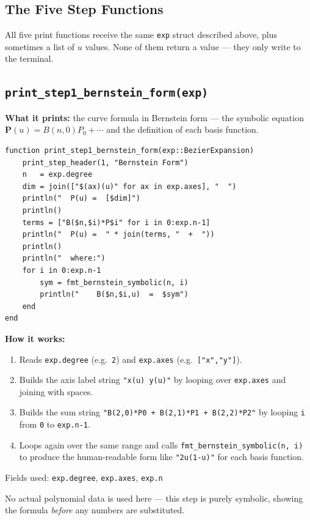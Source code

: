 \documentclass[12pt, a4paper]{article}
\newcommand{\cd}[1]{\texttt{#1}}
\begin{document}
\subsection*{The Five Step Functions}

All five print functions receive the same \cd{exp} struct
described above, plus sometimes a list of $u$ values.
None of them return a value --- they only write to the terminal.

\subsection{\texttt{print\_step1\_bernstein\_form(exp)}}

\textbf{What it prints:} the curve formula in Bernstein form ---
the symbolic equation $\mathbf{P}(u) = B(n,0)P_0 + \cdots$
and the definition of each basis function.

\begin{verbatim}
function print_step1_bernstein_form(exp::BezierExpansion)
    print_step_header(1, "Bernstein Form")
    n   = exp.degree
    dim = join(["$(ax)(u)" for ax in exp.axes], "  ")
    println("  P(u) =  [$dim]")
    println()
    terms = ["B($n,$i)*P$i" for i in 0:exp.n-1]
    println("  P(u) =  " * join(terms, "  +  "))
    println()
    println("  where:")
    for i in 0:exp.n-1
        sym = fmt_bernstein_symbolic(n, i)
        println("    B($n,$i,u)  =  $sym")
    end
end
\end{verbatim}

\textbf{How it works:}

\begin{enumerate}
  \item Reads \cd{exp.degree} (e.g.\ \cd{2}) and \cd{exp.axes}
        (e.g.\ \cd{["x","y"]}).
  \item Builds the axis label string \cd{"x(u)  y(u)"}
        by looping over \cd{exp.axes} and joining with spaces.
  \item Builds the sum string \cd{"B(2,0)*P0  +  B(2,1)*P1  +  B(2,2)*P2"}
        by looping \cd{i} from \cd{0} to \cd{exp.n-1}.
  \item Loops again over the same range and calls
        \cd{fmt\_bernstein\_symbolic(n, i)} to produce the
        human-readable form like \cd{"2u(1-u)"} for each basis function.
\end{enumerate}

\begin{examplebox}
Fields used: \cd{exp.degree}, \cd{exp.axes}, \cd{exp.n}

No actual polynomial data is used here --- this step is purely
symbolic, showing the formula \emph{before} any numbers are substituted.
\end{examplebox}
\end{document}
